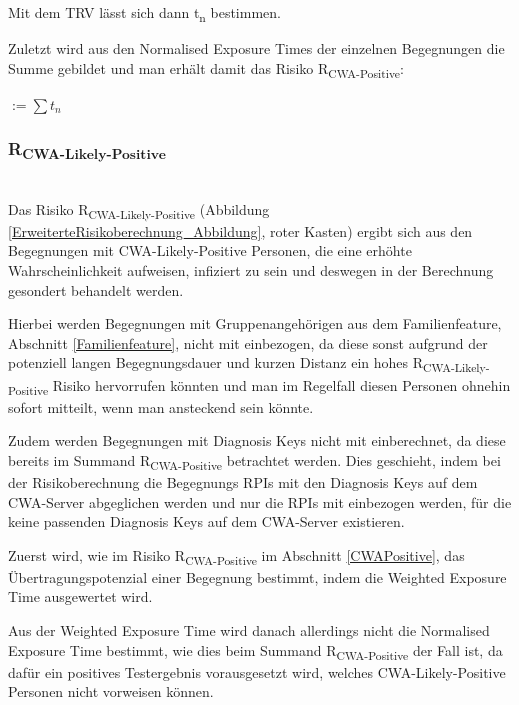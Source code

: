 \documentclass[conference,compsoc]{IEEEtran}
\begin{document}



\centerline{\text{ }}

Mit dem TRV lässt sich dann t\textsubscript{n} bestimmen.

Zuletzt wird aus den Normalised Exposure Times der einzelnen Begegnungen die Summe gebildet und man erhält damit das Risiko R\textsubscript{CWA-Positive}:

\centerline{\text{ }}
\centerline{  $ := \sum t_n$}
\centerline{\text{ }}

\subsubsection{R\textsubscript{CWA-Likely-Positive}}\label{CWALikelyPositive}
\text{}\\
Das Risiko R\textsubscript{CWA-Likely-Positive} (Abbildung \ref{ErweiterteRisikoberechnung_Abbildung}, roter Kasten) ergibt sich aus den Begegnungen mit CWA-Likely-Positive Personen, 
die eine erhöhte Wahrscheinlichkeit aufweisen, infiziert zu sein und deswegen in der Berechnung gesondert behandelt werden. 

Hierbei werden Begegnungen mit Gruppenangehörigen aus dem Familienfeature, Abschnitt \ref{Familienfeature}, nicht mit einbezogen, 
da diese sonst aufgrund der potenziell langen Begegnungsdauer und kurzen Distanz ein hohes R\textsubscript{CWA-Likely-Positive} Risiko hervorrufen könnten und 
man im Regelfall diesen Personen ohnehin sofort mitteilt, wenn man ansteckend sein könnte. 

Zudem werden Begegnungen mit Diagnosis Keys nicht mit einberechnet, da diese bereits im Summand R\textsubscript{CWA-Positive} betrachtet werden. 
Dies geschieht, indem bei der Risikoberechnung die Begegnungs RPIs mit den Diagnosis Keys auf dem CWA-Server abgeglichen werden und nur die RPIs mit einbezogen werden, 
für die keine passenden Diagnosis Keys auf dem CWA-Server existieren.

Zuerst wird, wie im Risiko R\textsubscript{CWA-Positive} im Abschnitt \ref{CWAPositive}, das Übertragungspotenzial einer Begegnung bestimmt, 
indem die Weighted Exposure Time ausgewertet wird. 

Aus der Weighted Exposure Time wird danach allerdings nicht die Normalised Exposure Time bestimmt, wie dies beim Summand R\textsubscript{CWA-Positive} der Fall ist, 
da dafür ein positives Testergebnis vorausgesetzt wird, welches CWA-Likely-Positive Personen nicht vorweisen können.
\end{document}
